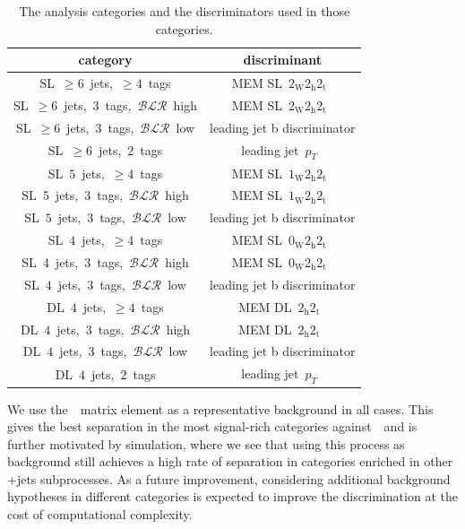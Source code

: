 \begin{table}[h!]
\begin{center}
\caption{The analysis categories and the discriminators used in those categories.}
\label{tab:cat_discriminant}
\begin{tabular}{c|c}
\hline
category & discriminant \\
\hline
SL~$\ge6$~jets,~$\ge4$~tags & MEM SL~$2_{\mathrm{W}} 2_{\mathrm{h}} 2_{\mathrm{t}}$~\\
SL~$\ge6$~jets,~$3$~tags,~$\mathcal{BLR}$~high & MEM SL~$2_{\mathrm{W}} 2_{\mathrm{h}} 2_{\mathrm{t}}$~\\
SL~$\ge6$~jets,~$3$~tags,~$\mathcal{BLR}$~low & leading jet b discriminator \\
SL~$\ge6$~jets,~$2$~tags & leading jet~$p_T$~\\
\hline
SL~$5$~jets,~$\ge4$~tags & MEM SL~$1_{\mathrm{W}} 2_{\mathrm{h}} 2_{\mathrm{t}}$~\\
SL~$5$~jets,~$3$~tags,~$\mathcal{BLR}$~high & MEM SL~$1_{\mathrm{W}} 2_{\mathrm{h}} 2_{\mathrm{t}}$~\\
SL~$5$~jets,~$3$~tags,~$\mathcal{BLR}$~low & leading jet b discriminator \\
\hline
SL~$4$~jets,~$\ge4$~tags & MEM SL~$0_{\mathrm{W}} 2_{\mathrm{h}} 2_{\mathrm{t}}$~\\
SL~$4$~jets,~$3$~tags,~$\mathcal{BLR}$~high & MEM SL~$0_{\mathrm{W}} 2_{\mathrm{h}} 2_{\mathrm{t}}$~\\
SL~$4$~jets,~$3$~tags,~$\mathcal{BLR}$~low & leading jet b discriminator \\
\hline
DL~$4$~jets,~$\ge4$~tags & MEM DL~$2_{\mathrm{h}} 2_{\mathrm{t}}$~\\
DL~$4$~jets,~$3$~tags,~$\mathcal{BLR}$~high & MEM DL~$2_{\mathrm{h}} 2_{\mathrm{t}}$~\\
DL~$4$~jets,~$3$~tags,~$\mathcal{BLR}$~low & leading jet b discriminator \\
DL~$4$~jets,~$2$~tags & leading jet~$p_T$~\\
\hline
\hline
\end{tabular}
\end{center}
\end{table}

We use the~\ttbb~matrix element as a representative background in all cases. This gives the best separation in the most signal-rich categories against~\ttbb~and is further motivated by simulation, where we see that using this process as background still achieves a high rate of separation in categories enriched in other \ttbar+jets subprocesses. As a future improvement, considering additional background hypotheses in different categories is expected to improve the discrimination at the cost of computational complexity.


